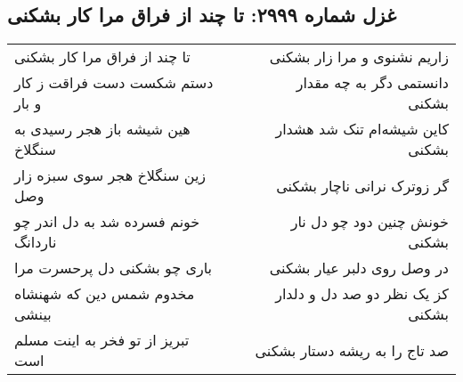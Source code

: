 \begin{center}
\section*{غزل شماره ۲۹۹۹: تا چند از فراق مرا کار بشکنی}
\label{sec:2999}
\begin{longtable}{l p{0.5cm} r}
تا چند از فراق مرا کار بشکنی
&&
زاریم نشنوی و مرا زار بشکنی
\\
دستم شکست دست فراقت ز کار و بار
&&
دانستمی دگر به چه مقدار بشکنی
\\
هین شیشه باز هجر رسیدی به سنگلاخ
&&
کاین شیشه‌ام تنک شد هشدار بشکنی
\\
زین سنگلاخ هجر سوی سبزه زار وصل
&&
گر زوترک نرانی ناچار بشکنی
\\
خونم فسرده شد به دل اندر چو ناردانگ
&&
خونش چنین دود چو دل نار بشکنی
\\
باری چو بشکنی دل پرحسرت مرا
&&
در وصل روی دلبر عیار بشکنی
\\
مخدوم شمس دین که شهنشاه بینشی
&&
کز یک نظر دو صد دل و دلدار بشکنی
\\
تبریز از تو فخر به اینت مسلم است
&&
صد تاج را به ریشه دستار بشکنی
\\
\end{longtable}
\end{center}
